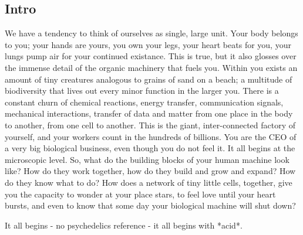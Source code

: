 \subsection{Intro}
We have a tendency to think of ourselves as single, large unit. Your body belongs to you; your hands are yours, you own your legs, your heart beats for you, your lungs pump air for your continued existance. This is true, but it also glosses over the immense detail of the organic machinery that fuels you. Within you exists an amount of tiny creatures analogous to grains of sand on a beach; a multitude of biodiversity that lives out every minor function in the larger you. There is a constant churn of chemical reactions, energy transfer, communication signals, mechanical interactions, transfer of data and matter from one place in the body to another, from one cell to another. This is the giant, inter-connected factory of yourself, and your workers count in the hundreds of billions. You are the CEO of a very big biological business, even though you do not feel it.
It all begins at the microscopic level. So, what do the building blocks of your human machine look like? How do they work together, how do they build and grow and expand? How do they know what to do? How does a network of tiny little cells, together, give you the capacity to wonder at your place stars, to feel love until your heart bursts, and even to know that some day your biological machine will shut down?

It all begins - no psychedelics reference - it all begins with *acid*. 